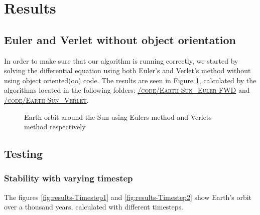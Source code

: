 \documentclass[../main.tex]{subfiles}
\begin{document}
\section{Results}\label{results}
\subsection{Euler and Verlet without object orientation}\label{sec:results-euler-verlet}
In order to make sure that our algorithm is running correctly, we started by solving the differential equation using both Euler's and Verlet's method without using object oriented(oo) code. The results are seen in Figure \ref{fig:EarthOrbit_Euler_Verlet}, calculated by the algorithms located in the following folders: \href{https://github.com/kmaasrud/Project-5/tree/master/code/Earth-Sun_Euler-FWD}{\textsc{/code/Earth-Sun\_Euler-FWD}} and \href{https://github.com/kmaasrud/Project-5/tree/master/code/Earth-Sun_Verlet}{\textsc{/code/Earth-Sun\_Verlet}}.

\begin{figure}[!h]
  \centering
  \caption{Earth orbit around the Sun using Eulers method and Verlets method respectively }
  \label{fig:EarthOrbit_Euler_Verlet}
\end{figure}
\FloatBarrier

\subsection{Testing}
\subsubsection{Stability with varying timestep} \label{sec:results-test-timestep}
The figures \ref{fig:results-Timestep1} and \ref{fig:results-Timestep2} show Earth's orbit over a thousand years, calculated with different timesteps.
\end{document}
